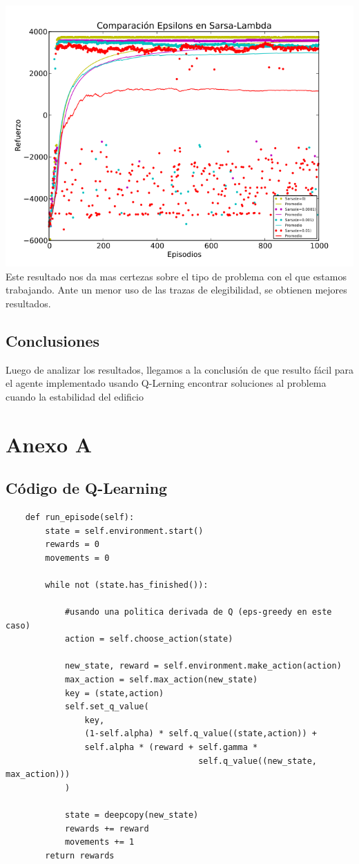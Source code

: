 \documentclass[11pt, a4paper]{article}
\begin{document}
\includegraphics[scale=0.6]{Graf5}
Este resultado nos da mas certezas sobre el tipo de problema con el que estamos trabajando. Ante un menor uso de las trazas de elegibilidad, se obtienen mejores resultados. 

\subsection{Conclusiones}
Luego de analizar los resultados, llegamos a la conclusi\'on de que resulto f\'acil para el agente implementado usando Q-Lerning encontrar soluciones al problema cuando la estabilidad del edificio

\newpage

\section{Anexo A}
\subsection{Código de Q-Learning}
\begin{verbatim}
    def run_episode(self):
        state = self.environment.start()
        rewards = 0
        movements = 0
        
        while not (state.has_finished()):
            
            #usando una politica derivada de Q (eps-greedy en este caso)
            action = self.choose_action(state)
            
            new_state, reward = self.environment.make_action(action)
            max_action = self.max_action(new_state)
            key = (state,action)
            self.set_q_value(
                key, 
                (1-self.alpha) * self.q_value((state,action)) + 
                self.alpha * (reward + self.gamma * 
                                       self.q_value((new_state, max_action)))
            )
            
            state = deepcopy(new_state)
            rewards += reward
            movements += 1
        return rewards
\end{verbatim}
\end{document}
